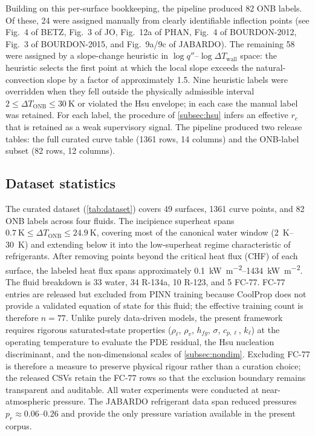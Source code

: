 Building on this per-surface bookkeeping, the pipeline produced
\num{82} ONB labels. Of these, \num{24} were
assigned manually from clearly identifiable inflection points (see
Fig.~4 of BETZ, Fig.~3 of JO, Fig.~12a of PHAN, Fig.~4 of
BOURDON-2012, Fig.~3 of BOURDON-2015, and Fig.~9a/9c of JABARDO).
The remaining \num{58} were assigned by a slope-change heuristic in
$\log q''$--$\log\Delta T_{\mathrm{wall}}$ space: the heuristic
selects the first point at which the local slope exceeds the
natural-convection slope by a factor of approximately \num{1.5}.
Nine heuristic labels were overridden when they fell outside the
physically admissible interval
$2 \le \Delta T_{\mathrm{ONB}} \le \SI{30}{\kelvin}$ or violated the
Hsu envelope; in each case the manual label was retained. For each
label, the procedure of \cref{subsec:hsu} infers an effective $r_c$
that is retained as a weak supervisory signal. The pipeline produced
two release tables: the full curated curve table (\num{1361} rows,
14 columns) and the ONB-label subset (\num{82} rows, 12 columns).

\subsection{Dataset statistics}\label{subsec:stats}

The curated dataset (\cref{tab:dataset}) covers \num{49} surfaces,
\num{1361} curve points, and \num{82} ONB labels across four fluids.
The incipience superheat spans
$\SI{0.7}{\kelvin} \le \Delta T_{\mathrm{ONB}} \le \SI{24.9}{\kelvin}$,
covering most of the canonical water window
(\SIrange{2}{30}{\kelvin}) and extending below it into the
low-superheat regime characteristic of refrigerants. After removing
points beyond the critical heat flux (CHF) of each surface, the
labeled heat flux spans approximately
\SIrange{0.1}{1434}{\kilo\watt\per\square\meter}. The fluid
breakdown is \num{33} water, \num{34} R-134a, \num{10} R-123, and
\num{5} FC-77. FC-77 entries are released but excluded from PINN
training because CoolProp does not provide a validated equation of
state for this fluid; the effective training count is therefore
$n=\num{77}$. Unlike purely data-driven models, the present
framework requires rigorous saturated-state properties
($\rho_{\ell}$, $\rho_v$, $h_{fg}$, $\sigma$, $c_{p,\ell}$, $k_{\ell}$)
at the operating temperature to evaluate the PDE residual, the
Hsu nucleation discriminant, and the non-dimensional scales of
\cref{subsec:nondim}. Excluding FC-77 is therefore a measure to
preserve physical rigour rather than a curation choice;
the released CSVs retain the FC-77 rows so that the exclusion
boundary remains transparent and auditable. All water experiments were conducted at
near-atmospheric pressure. The JABARDO refrigerant data span
reduced pressures $p_r \approx \numrange{0.06}{0.26}$ and provide
the only pressure variation available in the present corpus.

